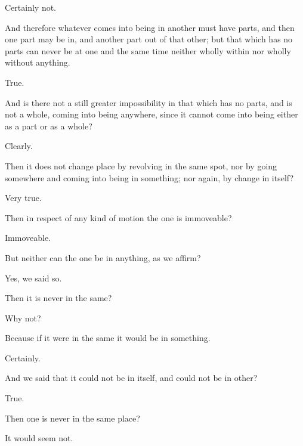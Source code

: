 \documentclass[11pt,letter]{article}
\begin{document}
\par  Certainly not.

\par  And therefore whatever comes into being in another must have parts, and then one part may be in, and another part out of that other; but that which has no parts can never be at one and the same time neither wholly within nor wholly without anything.

\par  True.

\par  And is there not a still greater impossibility in that which has no parts, and is not a whole, coming into being anywhere, since it cannot come into being either as a part or as a whole?

\par  Clearly.

\par  Then it does not change place by revolving in the same spot, nor by going somewhere and coming into being in something; nor again, by change in itself?

\par  Very true.

\par  Then in respect of any kind of motion the one is immoveable?

\par  Immoveable.

\par  But neither can the one be in anything, as we affirm?

\par  Yes, we said so.

\par  Then it is never in the same?

\par  Why not?

\par  Because if it were in the same it would be in something.

\par  Certainly.

\par  And we said that it could not be in itself, and could not be in other?

\par  True.

\par  Then one is never in the same place?

\par  It would seem not.
\end{document}
